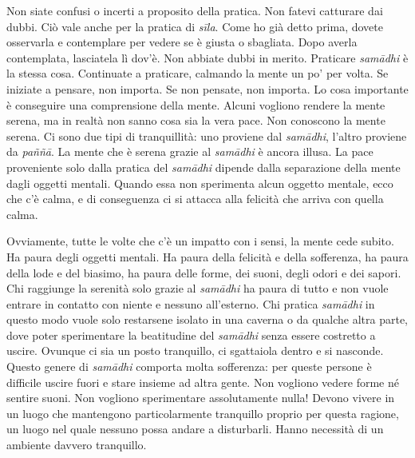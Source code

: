 Non siate confusi o incerti a proposito della pratica. Non fatevi
catturare dai dubbi. Ciò vale anche per la pratica di \emph{sīla}. Come
ho già detto prima, dovete osservarla e contemplare per vedere se è
giusta o sbagliata. Dopo averla contemplata, lasciatela lì dov'è. Non
abbiate dubbi in merito. Praticare \emph{samādhi} è la stessa cosa.
Continuate a praticare, calmando la mente un po' per volta. Se iniziate
a pensare, non importa. Se non pensate, non importa. Lo cosa importante
è conseguire una comprensione della mente. Alcuni vogliono rendere la
mente serena, ma in realtà non sanno cosa sia la vera pace. Non
conoscono la mente serena. Ci sono due tipi di tranquillità: uno
proviene dal \emph{samādhi}, l'altro proviene da \emph{paññā}. La mente
che è serena grazie al \emph{samādhi} è ancora illusa. La pace
proveniente solo dalla pratica del \emph{samādhi} dipende dalla
separazione della mente dagli oggetti mentali. Quando essa non
sperimenta alcun oggetto mentale, ecco che c'è calma, e di conseguenza
ci si attacca alla felicità che arriva con quella calma.

Ovviamente, tutte le volte che c'è un impatto con i sensi, la mente cede
subito. Ha paura degli oggetti mentali. Ha paura della felicità e della
sofferenza, ha paura della lode e del biasimo, ha paura delle forme, dei
suoni, degli odori e dei sapori. Chi raggiunge la serenità solo grazie
al \emph{samādhi} ha paura di tutto e non vuole entrare in contatto con
niente e nessuno all'esterno. Chi pratica \emph{samādhi} in questo modo
vuole solo restarsene isolato in una caverna o da qualche altra parte,
dove poter sperimentare la beatitudine del \emph{samādhi} senza essere
costretto a uscire. Ovunque ci sia un posto tranquillo, ci sgattaiola
dentro e si nasconde. Questo genere di \emph{samādhi} comporta molta
sofferenza: per queste persone è difficile uscire fuori e stare insieme
ad altra gente. Non vogliono vedere forme né sentire suoni. Non vogliono
sperimentare assolutamente nulla! Devono vivere in un luogo che
mantengono particolarmente tranquillo proprio per questa ragione, un
luogo nel quale nessuno possa andare a disturbarli. Hanno necessità di
un ambiente davvero tranquillo.

